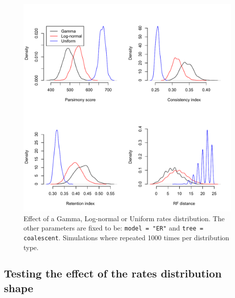 \documentclass{article}\usepackage[]{graphicx}\usepackage[]{color}
\begin{document}
\begin{figure}[!htbp]
\centering
   \includegraphics[width=1\textwidth]{Rate_distribution_effect.pdf}
\caption{Effect of a Gamma, Log-normal or Uniform rates distribution.
The other parameters are fixed to be: \texttt{model = "ER"} and \texttt{tree = coalescent}.
Simulations where repeated 1000 times per distribution type.}
\label{Rate_distribution_effect}
\end{figure}

\newpage
\subsection{Testing the effect of the rates distribution shape}
\end{document}
